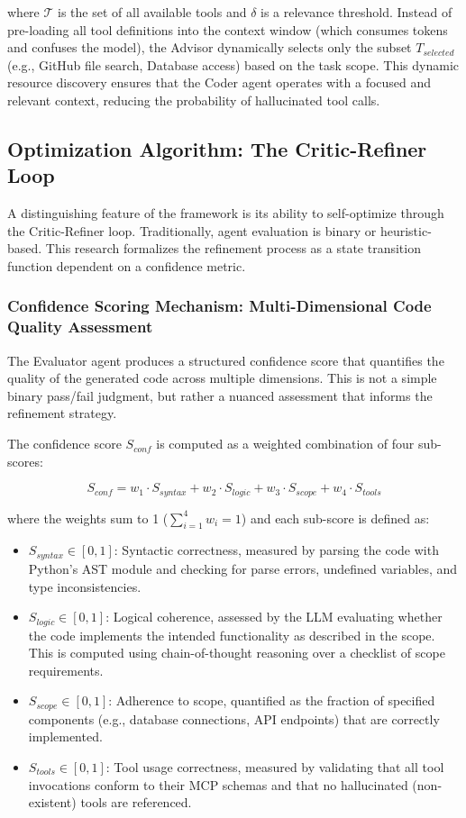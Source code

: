 \documentclass[lettersize,journal]{IEEEtran}
\begin{document}
where $\mathcal{T}$ is the set of all available tools and $\delta$ is a relevance threshold. Instead of pre-loading all tool definitions into the context window (which consumes tokens and confuses the model), the Advisor dynamically selects only the subset $T_{selected}$ (e.g., GitHub file search, Database access) based on the task scope. This dynamic resource discovery ensures that the Coder agent operates with a focused and relevant context, reducing the probability of hallucinated tool calls.

\subsection{Optimization Algorithm: The Critic-Refiner Loop}
A distinguishing feature of the framework is its ability to self-optimize through the Critic-Refiner loop. Traditionally, agent evaluation is binary or heuristic-based. This research formalizes the refinement process as a state transition function dependent on a confidence metric.


\subsubsection{Confidence Scoring Mechanism: Multi-Dimensional Code Quality Assessment}
The Evaluator agent produces a structured confidence score that quantifies the quality of the generated code across multiple dimensions. This is not a simple binary pass/fail judgment, but rather a nuanced assessment that informs the refinement strategy.

The confidence score $S_{conf}$ is computed as a weighted combination of four sub-scores:

\begin{equation}
\label{eq:confidence}
S_{conf} = w_1 \cdot S_{syntax} + w_2 \cdot S_{logic} + w_3 \cdot S_{scope} + w_4 \cdot S_{tools}
\end{equation}

where the weights sum to 1 ($\sum_{i=1}^{4} w_i = 1$) and each sub-score is defined as:

\begin{itemize}
    \item $S_{syntax} \in [0,1]$: Syntactic correctness, measured by parsing the code with Python's AST module and checking for parse errors, undefined variables, and type inconsistencies.
    \item $S_{logic} \in [0,1]$: Logical coherence, assessed by the LLM evaluating whether the code implements the intended functionality as described in the scope. This is computed using chain-of-thought reasoning over a checklist of scope requirements.
    \item $S_{scope} \in [0,1]$: Adherence to scope, quantified as the fraction of specified components (e.g., database connections, API endpoints) that are correctly implemented.
    \item $S_{tools} \in [0,1]$: Tool usage correctness, measured by validating that all tool invocations conform to their MCP schemas and that no hallucinated (non-existent) tools are referenced.
\end{itemize}
\end{document}
